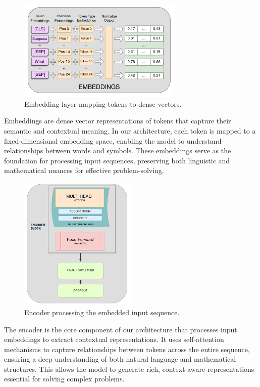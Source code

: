 \documentclass{article}
\begin{document}
\begin{figure}[htbp]
  \centering
  \includegraphics[width=0.7\textwidth]{./figures/embeddings.png}
  \caption{Embedding layer mapping tokens to dense vectors.}
  \label{fig:embeddings}
\end{figure}

Embeddings are dense vector representations of tokens that capture their semantic and contextual meaning. In our architecture, each token is mapped to a fixed-dimensional embedding space, enabling the model to understand relationships between words and symbols. These embeddings serve as the foundation for processing input sequences, preserving both linguistic and mathematical nuances for effective problem-solving.

\begin{figure}[htbp]
  \centering
  \includegraphics[width=0.5\textwidth]{./figures/encoder.png}
  \caption{Encoder processing the embedded input sequence.}
  \label{fig:encoder}
\end{figure}

The encoder is the core component of our architecture that processes input embeddings to extract contextual representations. It uses self-attention mechanisms to capture relationships between tokens across the entire sequence, ensuring a deep understanding of both natural language and mathematical structures. This allows the model to generate rich, context-aware representations essential for solving complex problems.
\end{document}

